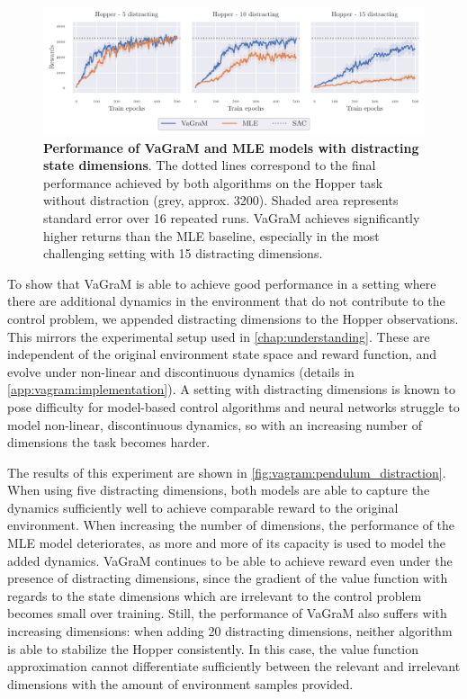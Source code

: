\begin{figure}[t]
    \includegraphics[clip, trim=0.2cm 0.0cm 0.4cm 0.0cm, width=1.\linewidth]{figures/vagram/fig_1.pdf}
    \caption{\textbf{Performance of VaGraM and MLE models with distracting state dimensions}. The dotted lines correspond to the final performance achieved by both algorithms on the Hopper task without distraction (grey, approx. 3200). Shaded area represents standard error over 16 repeated runs. VaGraM achieves significantly higher returns than the MLE baseline, especially in the most challenging setting with 15 distracting dimensions.}
    \label{fig:vagram:pendulum_distraction}
\end{figure}

To show that VaGraM is able to achieve good performance in a setting where there are additional dynamics in the environment that do not contribute to the control problem, we appended distracting dimensions to the Hopper observations.
This mirrors the experimental setup used in \autoref{chap:understanding}.
These are independent of the original environment state space and reward function, and evolve under non-linear and discontinuous dynamics (details in \autoref{app:vagram:implementation}).
A setting with distracting dimensions is known to pose difficulty for model-based control algorithms \parencite{stone2021thedc} and neural networks struggle to model non-linear, discontinuous dynamics, so with an increasing number of dimensions the task becomes harder.

The results of this experiment are shown in \autoref{fig:vagram:pendulum_distraction}.
When using five distracting dimensions, both models are able to capture the dynamics sufficiently well to achieve comparable reward to the original environment.
When increasing the number of dimensions, the performance of the MLE model deteriorates, as more and more of its capacity is used to model the added dynamics.
VaGraM continues to be able to achieve reward even under the presence of distracting dimensions, since the gradient of the value function with regards to the state dimensions which are irrelevant to the control problem becomes small over training.
Still, the performance of VaGraM also suffers with increasing dimensions: when adding 20 distracting dimensions, neither algorithm is able to stabilize the Hopper consistently.
In this case, the value function approximation cannot differentiate sufficiently between the relevant and irrelevant dimensions with the amount of environment samples provided.

